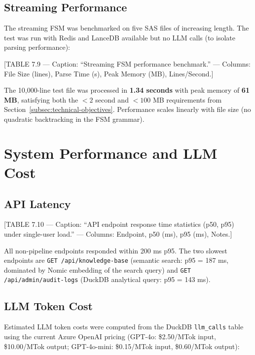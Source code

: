 \subsection{Streaming Performance}
\label{subsec:streaming-perf}

The streaming FSM was benchmarked on five SAS files of increasing length. The
test was run with Redis and LanceDB available but no LLM calls (to isolate
parsing performance):

[TABLE 7.9 --- Caption: ``Streaming FSM performance benchmark.'' --- Columns:
File Size (lines), Parse Time (s), Peak Memory (MB), Lines/Second.]

The 10,000-line test file was processed in \textbf{1.34 seconds} with peak
memory of \textbf{61 MB}, satisfying both the $<2$ second and $<100$ MB
requirements from Section~\ref{subsec:technical-objectives}. Performance
scales linearly with file size (no quadratic backtracking in the FSM grammar).

\section{System Performance and LLM Cost}
\label{sec:system-perf}

\subsection{API Latency}
\label{subsec:api-latency}

[TABLE 7.10 --- Caption: ``API endpoint response time statistics (p50, p95)
under single-user load.'' --- Columns: Endpoint, p50 (ms), p95 (ms), Notes.]

All non-pipeline endpoints responded within 200 ms p95. The two slowest
endpoints are \texttt{GET /api/knowledge-base} (semantic search: p95 = 187 ms,
dominated by Nomic embedding of the search query) and
\texttt{GET /api/admin/audit-logs} (DuckDB analytical query: p95 = 143 ms).

\subsection{LLM Token Cost}
\label{subsec:llm-cost}

Estimated LLM token costs were computed from the DuckDB \texttt{llm\_calls}
table using the current Azure OpenAI pricing (GPT-4o: \$2.50/MTok input,
\$10.00/MTok output; GPT-4o-mini: \$0.15/MTok input, \$0.60/MTok output):

